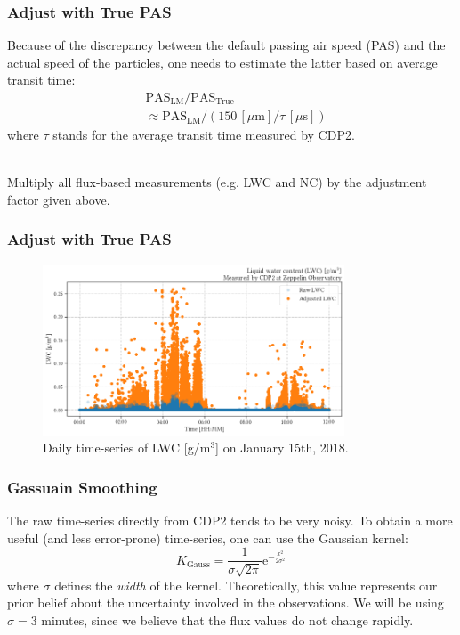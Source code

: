 \documentclass{beamer}
\begin{document}
\begin{frame}
    \frametitle{Adjust with True PAS}
    Because of the discrepancy between the default passing air speed (PAS) and the actual speed of the particles, one needs to estimate the latter based on average transit time:
    \begin{align*}
         & \mathrm{PAS}_\mathrm{LM} / \mathrm{PAS}_\mathrm{True}                                   \\
         & \approx \mathrm{PAS}_\mathrm{LM} / (150 \, [\mu \mathrm{m}] / \tau \, [\mu \mathrm{s}])
    \end{align*}
    where $\tau$ stands for the average transit time measured by CDP2.\\~\

    Multiply all flux-based measurements (e.g. LWC and NC) by the adjustment factor given above.
\end{frame}

\begin{frame}
    \frametitle{Adjust with True PAS}
    \begin{figure}
        \centering
        \includegraphics[width=0.8\textwidth]{img/pas.png}
        \caption{Daily time-series of LWC [g/m$^3$] on January 15th, 2018.}
    \end{figure}
\end{frame}

\begin{frame}
    \frametitle{Gassuain Smoothing}
    The raw time-series directly from CDP2 tends to be very noisy. To obtain a more useful (and less error-prone) time-series, one can use the Gaussian kernel:
    \begin{equation*}
        K_\mathrm{Gauss} = \frac{1}{\sigma \sqrt{2 \pi}} \mathrm{e}^{-\frac{x^2}{2 \sigma^2}}
    \end{equation*}
    where $\sigma$ defines the \emph{width} of the kernel. Theoretically, this value represents our prior belief about the uncertainty involved in the observations. We will be using $\sigma = 3$ minutes, since we believe that the flux values do not change rapidly.
\end{frame}
\end{document}
